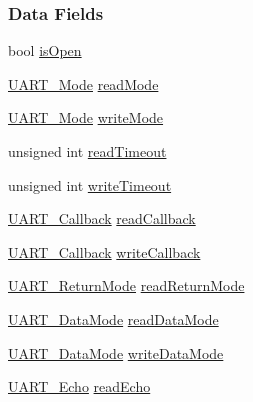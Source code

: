 \subsubsection*{Data Fields}
\begin{DoxyCompactItemize}
\item 
bool \hyperlink{struct_u_a_r_t_e_u_s_c_i_a___object_a876bd31eb61666ec63ac78411407ce84}{is\-Open}
\item 
\hyperlink{_u_a_r_t_8h_a2507a620dba95cd20885c52494d19e90}{U\-A\-R\-T\-\_\-\-Mode} \hyperlink{struct_u_a_r_t_e_u_s_c_i_a___object_a19f25d2126d3ab9b46802d1d1e5b2394}{read\-Mode}
\item 
\hyperlink{_u_a_r_t_8h_a2507a620dba95cd20885c52494d19e90}{U\-A\-R\-T\-\_\-\-Mode} \hyperlink{struct_u_a_r_t_e_u_s_c_i_a___object_a300f14a42ac00aab851ba72d2d75eb84}{write\-Mode}
\item 
unsigned int \hyperlink{struct_u_a_r_t_e_u_s_c_i_a___object_a03908f18cc9a7c259a6145c9dac9f78d}{read\-Timeout}
\item 
unsigned int \hyperlink{struct_u_a_r_t_e_u_s_c_i_a___object_a72652cb4e609a19af8d8c32cc8ebc83c}{write\-Timeout}
\item 
\hyperlink{_u_a_r_t_8h_a74c489f070c575fb11654fe74302b5b8}{U\-A\-R\-T\-\_\-\-Callback} \hyperlink{struct_u_a_r_t_e_u_s_c_i_a___object_a48d94342a6819603b31ac41c4a487a03}{read\-Callback}
\item 
\hyperlink{_u_a_r_t_8h_a74c489f070c575fb11654fe74302b5b8}{U\-A\-R\-T\-\_\-\-Callback} \hyperlink{struct_u_a_r_t_e_u_s_c_i_a___object_a5f6b50178f7b8f8f0584ee303d1e5aa3}{write\-Callback}
\item 
\hyperlink{_u_a_r_t_8h_acb5a82843435a1b5d51b6c27028d914f}{U\-A\-R\-T\-\_\-\-Return\-Mode} \hyperlink{struct_u_a_r_t_e_u_s_c_i_a___object_aca4e5d32a4a4929026e578e9282f686f}{read\-Return\-Mode}
\item 
\hyperlink{_u_a_r_t_8h_a694090fdb166f94ac30b809f9cba87b8}{U\-A\-R\-T\-\_\-\-Data\-Mode} \hyperlink{struct_u_a_r_t_e_u_s_c_i_a___object_a5051d7c819bc1715f388d006810c3d9c}{read\-Data\-Mode}
\item 
\hyperlink{_u_a_r_t_8h_a694090fdb166f94ac30b809f9cba87b8}{U\-A\-R\-T\-\_\-\-Data\-Mode} \hyperlink{struct_u_a_r_t_e_u_s_c_i_a___object_ae591cb092a522c26513871cc3ebcc549}{write\-Data\-Mode}
\item 
\hyperlink{_u_a_r_t_8h_aac6a03c2e1d76f53e1d9d923dcdc24f2}{U\-A\-R\-T\-\_\-\-Echo} \hyperlink{struct_u_a_r_t_e_u_s_c_i_a___object_a94f56220b0db1f89455fbd5469679518}{read\-Echo}
\item 

\end{DoxyCompactItemize}
